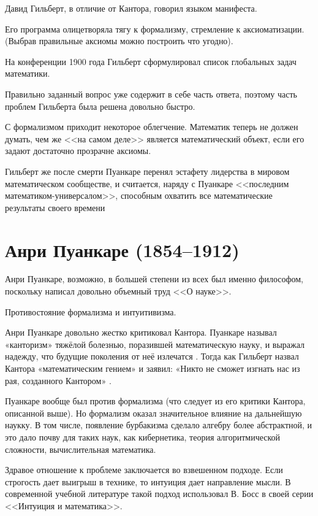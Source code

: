 \documentclass[a4paper,14pt]{extreport}
\begin{document}
Давид Гильберт, в отличие от Кантора, говорил языком манифеста.

Его программа олицетворяла тягу к формализму, стремление к аксиоматизации. (Выбрав правильные аксиомы можно построить что угодно).

На конференции 1900 года Гильберт сформулировал список глобальных задач математики.

Правильно заданный вопрос уже содержит в себе часть ответа, поэтому часть проблем Гильберта была решена довольно быстро.

С формализмом приходит некоторое облегчение. Математик теперь не должен думать, чем же <<на самом деле>> является математический объект, если его задают достаточно прозрачне аксиомы.

Гильберт же после смерти Пуанкаре перенял эстафету лидерства в мировом математическом сообществе, и считается, наряду с Пуанкаре <<последним математиком-универсалом>>, способным охватить все математические результаты своего времени \cite{wiki_poincare}

\label{poincare}
\section{Анри Пуанкаре (1854--1912)}

Анри Пуанкаре, возможно, в большей степени из всех был именно философом, поскольку написал довольно объемный труд <<О науке>>.

Противостояние формализма и интуитивизма.

Анри Пуанкаре довольно жестко критиковал Кантора. Пуанкаре называл «канторизм» тяжёлой болезнью, поразившей математическую науку, и выражал надежду, что будущие поколения от неё излечатся \cite{wiki_cantor}. Тогда как Гильберт назвал Кантора «математическим гением» и заявил: «Никто не сможет изгнать нас из рая, созданного Кантором» \cite{wiki_cantor}.

Пуанкаре вообще был против формализма (что следует из его критики Кантора, описанной выше). Но формализм оказал значительное влияние на дальнейшую наукку. В том числе, появление бурбакизма сделало алгебру более абстрактной, и это дало почву для таких наук, как кибернетика, теория алгоритмической сложности, вычислительная математика.

Здравое отношение к проблеме заключается во взвешенном подходе. Если строгость дает выигрыш в технике, то интуиция дает направление мысли. В современной учебной литературе такой подход использовал В. Босс в своей серии <<Интуиция и математика>>.
\end{document}
